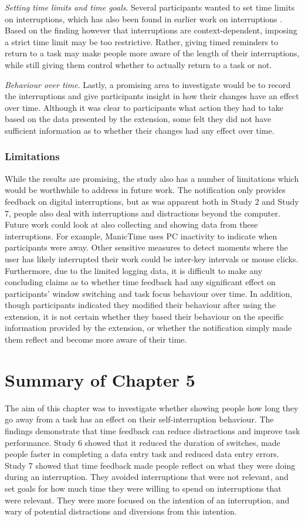 \textit{Setting time limits and time goals}. Several participants wanted to set time limits on interruptions, which has also been found in earlier work on interruptions \citep{Mark2018, Whittaker2016}. Based on the finding however that interruptions are context-dependent, imposing a strict time limit may be too restrictive. Rather, giving timed reminders to return to a task may make people more aware of the length of their interruptions, while still giving them control whether to actually return to a task or not. 

\textit{Behaviour over time}. Lastly, a promising area to investigate would be to record the interruptions and give participants insight in how their changes have an effect over time. Although it was clear to participants what action they had to take based on the data presented by the extension, some felt they did not have sufficient information as to whether their changes had any effect over time.

\subsubsection{Limitations}
While the results are promising, the study also has a number of limitations which would be worthwhile to address in future work. The notification only provides feedback on digital interruptions, but as was apparent both in Study 2 and Study 7, people also deal with interruptions and distractions beyond the computer. Future work could look at also collecting and showing data from these interruptions. For example, ManicTime uses PC inactivity to indicate when participants were away. Other sensitive measures to detect moments where the user has likely interrupted their work could be inter-key intervals or mouse clicks. Furthermore, due to the limited logging data, it is difficult to make any concluding claims as to whether time feedback had any significant effect on participants’ window switching and task focus behaviour over time. In addition, though participants indicated they modified their behaviour after using the extension, it is not certain whether they based their behaviour on the specific information provided by the extension, or whether the notification simply made them reflect and become more aware of their time. 

\section{Summary of Chapter 5}
The aim of this chapter was to investigate whether showing people how long they go away from a task has an effect on their self-interruption behaviour. The findings demonstrate that time feedback can reduce distractions and improve task performance. Study 6 showed that it reduced the duration of switches, made people faster in completing a data entry task and reduced data entry errors. Study 7 showed that time feedback made people reflect on what they were doing during an interruption. They avoided interruptions that were not relevant, and set goals for how much time they were willing to spend on interruptions that were relevant. They were more focused on the intention of an interruption, and wary of potential distractions and diversions from this intention. 

